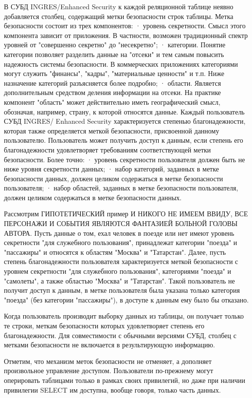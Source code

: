 В СУБД INGRES/Enhanced Security к каждой реляционной таблице неявно добавляется столбец, содержащий метки безопасности строк таблицы. Метка безопасности состоит из трех компонентов:
· уровень секретности. Смысл этого компонента зависит от приложения. В частности, возможен традиционный спектр уровней от "совершенно секретно" до "несекретно";
· категории. Понятие категории позволяет разделить данные на "отсеки" и тем самым повысить надежность системы безопасности. В коммерческих приложениях категориями могут служить "финансы", "кадры", "материальные ценности" и т.п. Ниже назначение категорий разъясняется более подробно;
· области. Является дополнительным средством деления информации на отсеки. На практике компонент "область" может действительно иметь географический смысл, обозначая, например, страну, к которой относятся данные.
Каждый пользователь СУБД INGRES/ Enhanced Security характеризуется степенью благонадежности, которая также определяется меткой безопасности, присвоенной данному пользователю. Пользователь может получить доступ к данным, если степень его благонадежности удовлетворяет требованиям соответствующей метки безопасности. Более точно:
· уровень секретности пользователя должен быть не ниже уровня секретности данных;
· набор категорий, заданных в метке безопасности данных, должен целиком содержаться в метке безопасности пользователя;
· набор областей, заданных в метке безопасности пользователя, должен целиком содержаться в метке безопасности данных.

Рассмотрим ГИПОТЕТИЧЕСКИЙ пример И НИКОГО НЕ ИМЕЕМ ВВИДУ, ВСЕ ПЕРСОНАЖИ И СОБЫТИЯ ЯВЛЯЮТСЯ ФАНТАЗИЕЙ БОЛЬНОЙ ГОЛОВЫ АВТОРА. Пусть данные о том, ехал человек в поезде или нет имеют уровень секретности "для служебного пользования", принадлежат категории "поезда" и "пассажиры" и относятся к областям "Москва" и "Татарстан". Далее, пусть степень благонадежности пользователя характеризуется меткой безопасности с уровнем секретности "для служебного пользования", категориями "поезда" и "самолеты", а также областью "Москва" и "Татарстан". Такой пользователь не получит доступ к данным, в метке пользователя была указана только категория "поезда" (без категории "пассажиры"), в доступе к данным ему было бы отказано.

Когда пользователь производит выборку данных из таблицы, он получает только те строки, меткам безопасности которых удовлетворяет степень его благонадежности. Для совместимости с обычными версиями СУБД, столбец с метками безопасности не включается в результирующую информацию.

Отметим, что механизм меток безопасности не отменяет, а дополняет произвольное управление доступом. Пользователи по-прежнему могут оперировать таблицами только в рамках своих привилегий, но даже при наличии привилегии SELECT им доступна, вообще говоря, только часть данных.

